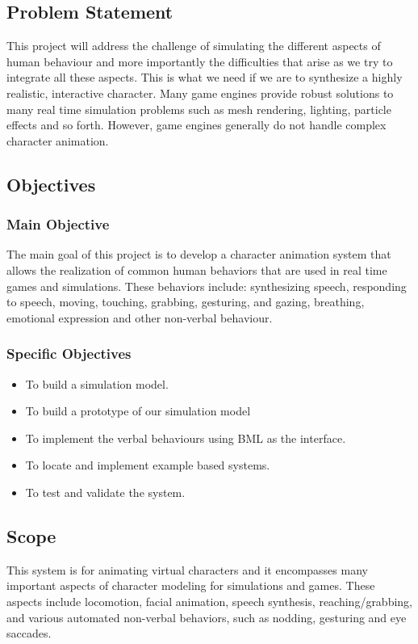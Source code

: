 \documentclass[options]{article}
\begin{document}
\subsection{\textbf{Problem Statement}}
This project will address the challenge of simulating the different aspects of human behaviour and more importantly the difficulties that arise as we try to integrate all these aspects. This is what we need if we are to synthesize a highly realistic, interactive character. \bigbreak
Many game engines provide robust solutions to many real time simulation problems such as mesh rendering, lighting, particle effects and so forth. However, game engines generally do not handle complex character animation.


\subsection{\textbf{Objectives}}


\subsubsection{\textbf{Main Objective}} 
The main goal of this project is to develop a character animation system that allows the realization of common human behaviors that are used in real time games and simulations. \bigbreak
These behaviors include: synthesizing speech, responding to speech, moving, touching, grabbing, gesturing, and gazing, breathing, emotional expression and other non-verbal behaviour.


\subsubsection{\textbf{Specific Objectives}}

\begin{itemize}
  \item To build a simulation model.
  \item To build a prototype of our simulation model
  \item To implement the verbal behaviours using BML as the interface.
  \item To locate and implement example based systems.
  \item To test and validate the system.
\end{itemize}


\subsection{\textbf{Scope}}
This system is for animating virtual characters and it encompasses many important aspects of character modeling for simulations and games. These aspects include \cite{latexMath}locomotion, facial animation, speech synthesis, reaching/grabbing, and various automated non-verbal behaviors, such as nodding, gesturing and eye saccades.
\end{document}
